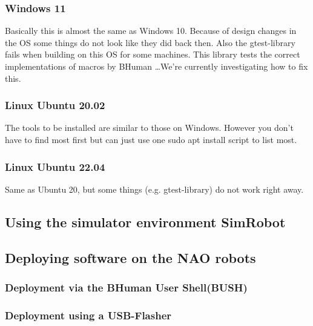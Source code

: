 \subsubsection{Windows 11}

Basically this is almost the same as Windows 10. Because of design changes in the OS some things do not look like they did back then. Also the gtest-library fails when building on this OS for some machines. This library tests the correct implementations of macros by BHuman \dots We're currently investigating how to fix this.

\subsubsection{Linux Ubuntu 20.02}

The tools to be installed are similar to those on Windows. However you don't have to find most first but can just use one sudo apt install script to list most.

\subsubsection{Linux Ubuntu 22.04}
Same as Ubuntu 20, but some things (e.g. gtest-library) do not work right away.

\subsection{Using the simulator environment SimRobot}

\subsection{Deploying software on the NAO robots}

\subsubsection{Deployment via the BHuman User Shell(BUSH)}

\subsubsection{Deployment using a USB-Flasher}